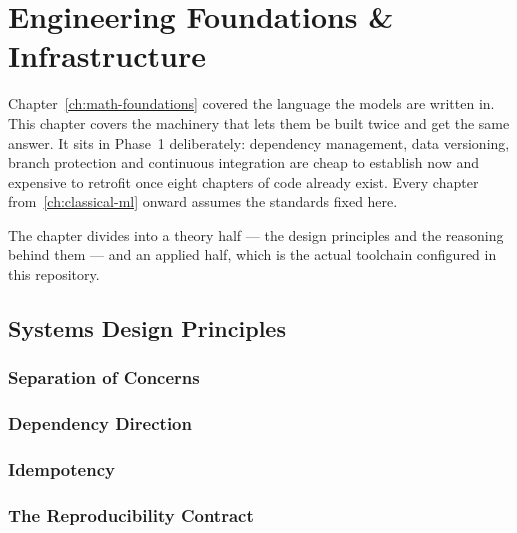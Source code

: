 %
\chapter{Engineering Foundations \& Infrastructure}
\label{ch:engineering-foundations}

Chapter~\ref{ch:math-foundations} covered the language the models are written
in. This chapter covers the machinery that lets them be built twice and get the
same answer. It sits in Phase~1 deliberately: dependency management, data
versioning, branch protection and continuous integration are cheap to establish
now and expensive to retrofit once eight chapters of code already exist. Every
chapter from~\ref{ch:classical-ml} onward assumes the standards fixed here.

The chapter divides into a theory half --- the design principles and the
reasoning behind them --- and an applied half, which is the actual toolchain
configured in this repository.

\section{Systems Design Principles}
\label{sec:systems-design}

\subsection{Separation of Concerns}

\subsection{Dependency Direction}

\subsection{Idempotency}

\subsection{The Reproducibility Contract}

